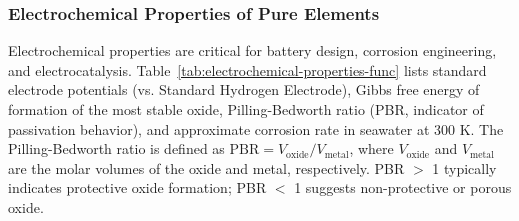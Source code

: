 \documentclass[12pt,a4paper]{article}
\begin{document}
	\subsubsection{Electrochemical Properties of Pure Elements}
	\label{subsec:electrochemical-properties-func}
	
	Electrochemical properties are critical for battery design, corrosion engineering, and electrocatalysis. Table~\ref{tab:electrochemical-properties-func} lists standard electrode potentials (vs. Standard Hydrogen Electrode), Gibbs free energy of formation of the most stable oxide, Pilling-Bedworth ratio (PBR, indicator of passivation behavior), and approximate corrosion rate in seawater at 300 K. The Pilling-Bedworth ratio is defined as \(\text{PBR} = V_{\text{oxide}} / V_{\text{metal}}\), where \(V_{\text{oxide}}\) and \(V_{\text{metal}}\) are the molar volumes of the oxide and metal, respectively. PBR $>$ 1 typically indicates protective oxide formation; PBR $<$ 1 suggests non-protective or porous oxide.
	
\end{document}
